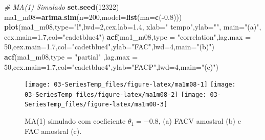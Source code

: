\documentclass[
]{book}
\newenvironment{Shaded}{\begin{snugshade}}{\end{snugshade}}
\newcommand{\CommentTok}[1]{\textcolor[rgb]{0.56,0.35,0.01}{\textit{#1}}}
\newcommand{\DataTypeTok}[1]{\textcolor[rgb]{0.13,0.29,0.53}{#1}}
\newcommand{\DecValTok}[1]{\textcolor[rgb]{0.00,0.00,0.81}{#1}}
\newcommand{\FloatTok}[1]{\textcolor[rgb]{0.00,0.00,0.81}{#1}}
\newcommand{\KeywordTok}[1]{\textcolor[rgb]{0.13,0.29,0.53}{\textbf{#1}}}
\newcommand{\NormalTok}[1]{#1}
\newcommand{\OperatorTok}[1]{\textcolor[rgb]{0.81,0.36,0.00}{\textbf{#1}}}
\newcommand{\StringTok}[1]{\textcolor[rgb]{0.31,0.60,0.02}{#1}}
\theoremstyle{definition}
\theoremstyle{definition}
\theoremstyle{definition}
\theoremstyle{remark}
\begin{document}
\begin{Shaded}
\begin{Highlighting}[]
\CommentTok{# MA(1) Simulado}
\KeywordTok{set.seed}\NormalTok{(}\DecValTok{12322}\NormalTok{)}
\NormalTok{ma1_m08=}\KeywordTok{arima.sim}\NormalTok{(}\DataTypeTok{n=}\DecValTok{200}\NormalTok{,}\DataTypeTok{model=}\KeywordTok{list}\NormalTok{(}\DataTypeTok{ma=}\KeywordTok{c}\NormalTok{(}\OperatorTok{-}\FloatTok{0.8}\NormalTok{)))}
\KeywordTok{plot}\NormalTok{(ma1_m08,}\DataTypeTok{type=}\StringTok{"l"}\NormalTok{,}\DataTypeTok{lwd=}\DecValTok{2}\NormalTok{,}\DataTypeTok{cex.lab=}\FloatTok{1.4}\NormalTok{, }\DataTypeTok{xlab=}\StringTok{" tempo"}\NormalTok{,}\DataTypeTok{ylab=}\StringTok{""}\NormalTok{, }\DataTypeTok{main=}\StringTok{"(a)"}\NormalTok{, }\DataTypeTok{cex.main=}\FloatTok{1.7}\NormalTok{,}\DataTypeTok{col=}\StringTok{"cadetblue4"}\NormalTok{)}
\KeywordTok{acf}\NormalTok{(ma1_m08,}\DataTypeTok{type =} \StringTok{"correlation"}\NormalTok{,}\DataTypeTok{lag.max =} \DecValTok{50}\NormalTok{,}\DataTypeTok{cex.main=}\FloatTok{1.7}\NormalTok{,}\DataTypeTok{col=}\StringTok{"cadetblue4"}\NormalTok{,}\DataTypeTok{ylab=}\StringTok{"FAC"}\NormalTok{,}\DataTypeTok{lwd=}\DecValTok{4}\NormalTok{,}\DataTypeTok{main=}\StringTok{"(b)"}\NormalTok{)}
\KeywordTok{acf}\NormalTok{(ma1_m08,}\DataTypeTok{type =} \StringTok{"partial"}\NormalTok{ ,}\DataTypeTok{lag.max =} \DecValTok{50}\NormalTok{,}\DataTypeTok{cex.main=}\FloatTok{1.7}\NormalTok{,}\DataTypeTok{col=}\StringTok{"cadetblue4"}\NormalTok{,}\DataTypeTok{ylab=}\StringTok{"FACP"}\NormalTok{,}\DataTypeTok{lwd=}\DecValTok{4}\NormalTok{,}\DataTypeTok{main=}\StringTok{"(c)"}\NormalTok{)}
\end{Highlighting}
\end{Shaded}

\begin{figure}
\texttt{[image: 03-SeriesTemp\_files/figure-latex/ma1m08-1]} \texttt{[image: 03-SeriesTemp\_files/figure-latex/ma1m08-2]} \texttt{[image: 03-SeriesTemp\_files/figure-latex/ma1m08-3]} \caption{MA(1) simulado com coeficiente $\theta_1=-0.8$, (a) FACV amostral (b) e FAC amostral (c).}\label{fig:ma1m08}
\end{figure}
\end{document}
